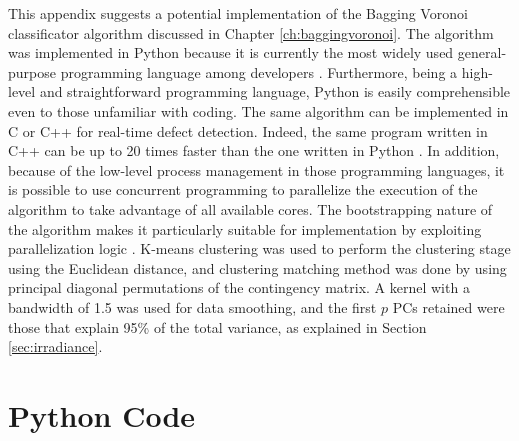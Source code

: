 This appendix suggests a potential implementation of the Bagging Voronoi classificator algorithm discussed in Chapter \ref{ch:baggingvoronoi}. The algorithm was implemented in Python because it is currently the most widely used general-purpose programming language among developers \cite{lionel_sujay_vailshery_most_2023}. Furthermore, being a high-level and straightforward programming language, Python is easily comprehensible even to those unfamiliar with coding. The same algorithm can be implemented in C or C++ for real-time defect detection. Indeed, the same program written in C++ can be up to 20 times faster than the one written in Python \cite{zehra_comparative_2020,towards_data_science_how_2020}. In addition, because of the low-level process management in those programming languages, it is possible to use concurrent programming to parallelize the execution of the algorithm to take advantage of all available cores. The bootstrapping nature of the algorithm makes it particularly suitable for implementation by exploiting parallelization logic \cite{secchi_bagging_2013}. K-means clustering was used to perform the clustering stage using the Euclidean distance, and clustering matching method was done by using principal diagonal permutations of the contingency matrix. A kernel with a bandwidth of 1.5 was used for data smoothing, and the first $p$ PCs retained were those that explain 95\% of the total variance, as explained in Section \ref{sec:irradiance}.
\section{Python Code}


